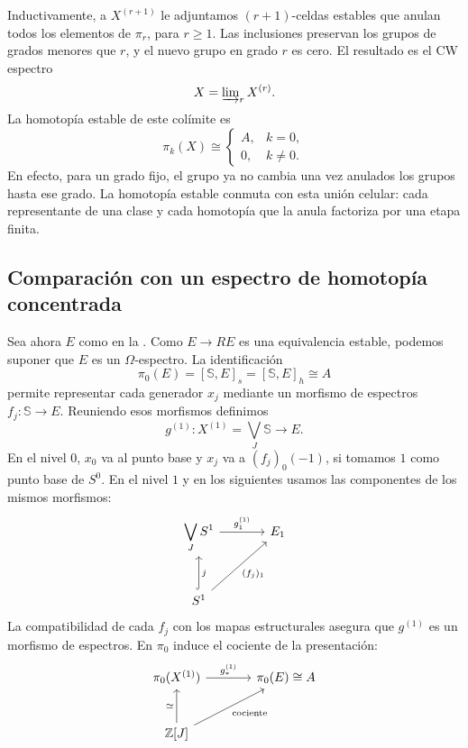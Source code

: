 Inductivamente, a $X^{(r+1)}$ le adjuntamos $(r+1)$-celdas estables que anulan todos los elementos de $\pi_r$, para $r\ge1$. Las inclusiones preservan los grupos de grados menores que $r$, y el nuevo grupo en grado $r$ es cero. El resultado es el CW espectro
\[
X=\varinjlim\nolimits_rX^{(r)}.
\]
La homotopía estable de este colímite es
\[
\pi_k(X)\cong
\begin{cases}
A,&k=0,\\
0,&k\ne0.
\end{cases}
\]
En efecto, para un grado fijo, el grupo ya no cambia una vez anulados los grupos hasta ese grado. La homotopía estable conmuta con esta unión celular: cada representante de una clase y cada homotopía que la anula factoriza por una etapa finita.

\subsection{Comparación con un espectro de homotopía concentrada}
Sea ahora $E$ como en la . Como $E\to RE$ es una equivalencia estable, podemos suponer que $E$ es un $\Omega$-espectro. La identificación
\[
\pi_0(E)=[\mathbb S,E]_s=[\mathbb S,E]_h\cong A
\]
permite representar cada generador $x_j$ mediante un morfismo de espectros $f_j\colon\mathbb S\to E$. Reuniendo esos morfismos definimos
\[
g^{(1)}\colon X^{(1)}=\bigvee_J\mathbb S\longrightarrow E.
\]
En el nivel $0$, $x_0$ va al punto base y $x_j$ va a $(f_j)_0(-1)$, si tomamos $1$ como punto base de $S^0$. En el nivel $1$ y en los siguientes usamos las componentes de los mismos morfismos:
\[
\begin{tikzcd}[column sep=large,row sep=large]
\displaystyle\bigvee_JS^1\arrow[r,"g^{(1)}_1"]&E_1\\
S^1\arrow[u,hook,"j"']\arrow[ur,"(f_j)_1"']&
\end{tikzcd}
\]
La compatibilidad de cada $f_j$ con los mapas estructurales asegura que $g^{(1)}$ es un morfismo de espectros. En $\pi_0$ induce el cociente de la presentación:
\[
\begin{tikzcd}[column sep=large,row sep=large]
\pi_0(X^{(1)})\arrow[r,"g^{(1)}_*"]&\pi_0(E)\cong A\\
\mathbb Z[J]\arrow[u,"\simeq"]\arrow[ur,"\text{cociente}"']&
\end{tikzcd}
\]

